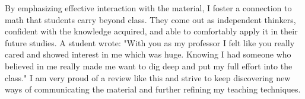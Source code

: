 \documentclass[11pt]{article}
\begin{document}
By emphasizing effective interaction with the material, I foster a connection to math that students carry beyond class. They come out as independent thinkers, confident with the knowledge acquired, and able to comfortably apply it in their future studies. A student wrote: "With you as my professor I felt like you really cared and showed interest in me which was huge.
Knowing I had someone who believed in me really made me want to dig deep and put my full effort into the class." I am very proud of a review like this and strive to keep discovering new ways of communicating the material and further refining my teaching techniques.
\end{document}
